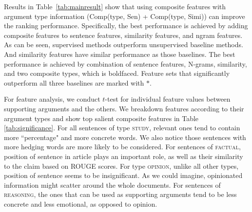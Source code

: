 Results in Table~\ref{tab:mainresult} show that %
%
using composite features with argument type information (Comp(type, Sen) + Comp(type, Simi)) can improve the ranking performance. Specifically, the best performance is achieved by adding composite features to sentence features, similarity features, and ngram features.
As can be seen, supervised methods outperform unsupervised baseline methods. And similarity features have similar performance as those baselines. The best performance is achieved by combination of sentence features, N-grams, similarity, and two composite types, which is boldfaced. Feature sets that significantly outperform all three baselines are marked with $\ast$.


For feature analysis, we conduct $t$-test for individual feature values between supporting arguments and the others. We breakdown features according to their argument types and show top salient composite features in Table \ref{tab:significance}. 
%
For all sentences of type \textsc{study}, relevant ones tend to contain more ``percentage" and more concrete words. We also notice those sentences with more hedging words are more likely to be considered. For sentences of \textsc{factual}, position of sentence in article plays an important role, as well as their similarity to the claim based on ROUGE scores. For type \textsc{opinion}, unlike all other types, position of sentence seems to be insignificant. As we could imagine, opinionated information might scatter around the whole documents. For sentences of \textsc{reasoning}, the ones that can be used as supporting arguments tend to be less concrete and less emotional, as opposed to opinion. 





